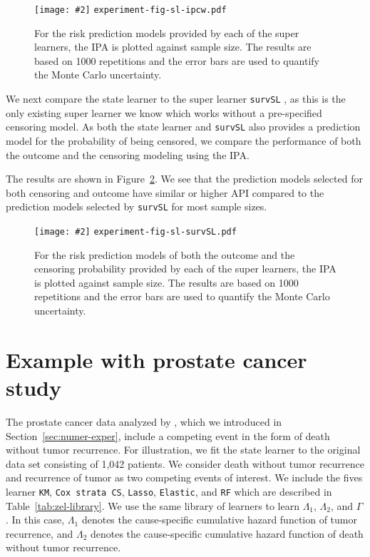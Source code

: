 \documentclass{statsoc}
\newcommand{\includeFigCond}[2][]{
  \ifx\nofig\undefined %
    \texttt{[image: \#2]} %
  \else %
    \texttt{#2} %
  \fi %
}
\newcommand{\1}{\mathds{1}}
\begin{document}
\begin{figure}
  \centering %
  \includeFigCond[width=1\linewidth]{experiment-fig-sl-ipcw.pdf}
  \caption[]{For the risk prediction models provided by each of the super
    learners, the IPA is plotted against sample size. The results are based on
    1000 repetitions and the error bars are used to quantify the Monte Carlo
    uncertainty.}
  \label{fig:ipcw-fail}
\end{figure}

We next compare the state learner to the super learner \texttt{survSL}
\citep{westling2021inference}, as this is the only existing super learner we
know which works without a pre-specified censoring model. As both the state
learner and \texttt{survSL} also provides a prediction model for the probability
of being censored, we compare the performance of both the outcome and the
censoring modeling using the IPA.

The results are shown in Figure~\ref{fig:zelefski}. We see that the prediction
models selected for both censoring and outcome have similar or higher API
compared to the prediction models selected by \texttt{survSL} for most sample
sizes.

\begin{figure}
  \centering %
  \includeFigCond[width=1\linewidth]{experiment-fig-sl-survSL.pdf}
  \caption[]{For the risk prediction models of both the outcome and the
    censoring probability provided by each of the super learners, the IPA is
    plotted against sample size. The results are based on 1000 repetitions and
    the error bars are used to quantify the Monte Carlo uncertainty.}
  \label{fig:zelefski}
\end{figure}


\section{Example with prostate cancer study}
\label{sec:real-data-appl}

The prostate cancer data analyzed by \cite{kattan2000pretreatment}, which we
introduced in Section~\ref{sec:numer-exper}, include a competing event in the
form of death without tumor recurrence. For illustration, we fit the state
learner to the original data set consisting of 1,042 patients. We consider death
without tumor recurrence and recurrence of tumor as two competing events of
interest. We include the fives learner \texttt{KM}, \texttt{Cox strata CS},
\texttt{Lasso}, \texttt{Elastic}, and \texttt{RF} which are described in
Table~\ref{tab:zel-library}. We use the same library of learners to learn
\( \Lambda_1 \), \( \Lambda_2 \), and $\Gamma$. In this case, \( \Lambda_1 \)
denotes the cause-specific cumulative hazard function of tumor recurrence, and
\( \Lambda_2 \) denotes the cause-specific cumulative hazard function of death
without tumor recurrence.
\end{document}
